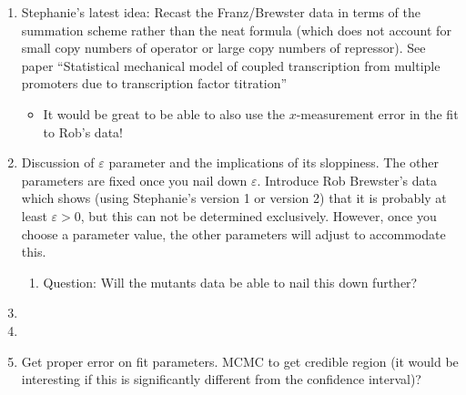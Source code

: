 \begin{enumerate}
	\item Stephanie's latest idea: Recast the Franz/Brewster data in terms of the
	summation scheme rather than the neat formula (which does not account for small
	copy numbers of operator or large copy numbers of repressor). See paper
	``Statistical mechanical model of coupled transcription from multiple promoters
	due to transcription factor titration'' \begin{itemize} \item It would be great
		to be able to also use the $x$-measurement error in the fit to Rob's data!
	\end{itemize}
	
	\item Discussion of $\varepsilon$ parameter and the implications of its
	sloppiness. The other parameters are fixed once you nail down $\varepsilon$.
	Introduce Rob Brewster's data  which shows (using Stephanie's version 1 or
	version 2) that it is probably at least $\varepsilon > 0$, but this can not be
	determined exclusively. However, once you choose a parameter value, the other
	parameters will adjust to accommodate this. \begin{enumerate} \item Question:
		Will the mutants data be able to nail this down further? \end{enumerate}
	
	\item {}
	
	\item {}
	
	\item Get proper error on fit parameters. MCMC to get credible region (it would
	be interesting if this is significantly different from the confidence
	interval)?
\end{enumerate}